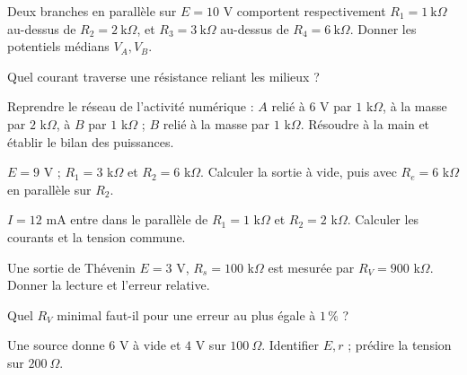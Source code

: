 \begin{questions}
\item Deux branches en parallèle sur $E=10$ V comportent respectivement $R_1=1\ \mathrm{k}\Omega$ au-dessus de $R_2=2\ \mathrm{k}\Omega$, et $R_3=3\ \mathrm{k}\Omega$ au-dessus de $R_4=6\ \mathrm{k}\Omega$. Donner les potentiels médians $V_A,V_B$.
\item Quel courant traverse une résistance reliant les milieux ?
\end{questions}

\begin{questions}
\item Reprendre le réseau de l’activité numérique : $A$ relié à $6$ V par $1$ k$\Omega$, à la masse par $2$ k$\Omega$, à $B$ par $1$ k$\Omega$ ; $B$ relié à la masse par $1$ k$\Omega$. Résoudre à la main et établir le bilan des puissances.
\end{questions}



\begin{questions}
\item $E=9$ V ; $R_1=3$ k$\Omega$ et $R_2=6$ k$\Omega$. Calculer la sortie à vide, puis avec $R_e=6$ k$\Omega$ en parallèle sur $R_2$.
\end{questions}

\begin{questions}
\item $I=12$ mA entre dans le parallèle de $R_1=1$ k$\Omega$ et $R_2=2$ k$\Omega$. Calculer les courants et la tension commune.
\end{questions}

\begin{questions}
\item Une sortie de Thévenin $E=3$ V, $R_s=100$ k$\Omega$ est mesurée par $R_V=900$ k$\Omega$. Donner la lecture et l’erreur relative.
\item Quel $R_V$ minimal faut-il pour une erreur au plus égale à $1\,\%$ ?
\end{questions}



\begin{questions}
\item Une source donne $6$ V à vide et $4$ V sur $100\ \Omega$. Identifier $E,r$ ; prédire la tension sur $200\ \Omega$.
\end{questions}

